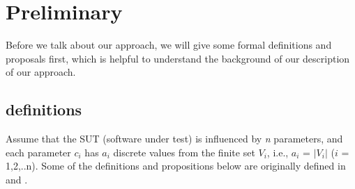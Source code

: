 \documentclass[10pt,journal,cspaper,compsoc]{IEEEtran}
\begin{document}
%


\section{Preliminary}
Before we talk about our approach, we will give some formal definitions and proposals first, which is helpful to understand the background of our description of our approach.

\subsection{definitions}
Assume that the SUT (software under test) is influenced by \emph{n} parameters, and each parameter $c_{i}$ has $a_{i}$ discrete values from the finite set $V_{i}$, i.e., $a_{i}$ = $|V_{i}|$ ($i$ = 1,2,..n). Some of the definitions and propositions below are originally defined in and .
\end{document}
